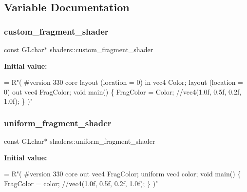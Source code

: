 \subsection{Variable Documentation}
\mbox{\label{namespaceshaders_a53aefc57e61e6526c0469b6790903754}} 
\subsubsection{\texorpdfstring{custom\+\_\+fragment\+\_\+shader}{custom\_fragment\_shader}}
{\footnotesize\ttfamily const G\+Lchar$\ast$ shaders\+::custom\+\_\+fragment\+\_\+shader\hspace{0.3cm}{\ttfamily [static]}}

{\bfseries Initial value\+:}
\begin{DoxyCode}
= R\textcolor{stringliteral}{"(}
\textcolor{stringliteral}{#version 330 core}
\textcolor{stringliteral}{}
\textcolor{stringliteral}{layout (location = 0) in  vec4 Color;}
\textcolor{stringliteral}{}
\textcolor{stringliteral}{layout (location = 0) out vec4 FragColor;}
\textcolor{stringliteral}{}
\textcolor{stringliteral}{void main()}
\textcolor{stringliteral}{\{}
\textcolor{stringliteral}{FragColor = Color; //vec4(1.0f, 0.5f, 0.2f, 1.0f);}
\textcolor{stringliteral}{\}}
\textcolor{stringliteral}{)"}
\end{DoxyCode}
\mbox{\label{namespaceshaders_adb630ad693498e928fa4fec5657b7fbd}} 
\subsubsection{\texorpdfstring{uniform\+\_\+fragment\+\_\+shader}{uniform\_fragment\_shader}}
{\footnotesize\ttfamily const G\+Lchar$\ast$ shaders\+::uniform\+\_\+fragment\+\_\+shader\hspace{0.3cm}{\ttfamily [static]}}

{\bfseries Initial value\+:}
\begin{DoxyCode}
= R\textcolor{stringliteral}{"(}
\textcolor{stringliteral}{#version 330 core}
\textcolor{stringliteral}{}
\textcolor{stringliteral}{out vec4 FragColor;}
\textcolor{stringliteral}{}
\textcolor{stringliteral}{uniform vec4 color;}
\textcolor{stringliteral}{}
\textcolor{stringliteral}{void main()}
\textcolor{stringliteral}{\{}
\textcolor{stringliteral}{FragColor = color; //vec4(1.0f, 0.5f, 0.2f, 1.0f);}
\textcolor{stringliteral}{\}}
\textcolor{stringliteral}{)"}
\end{DoxyCode}
